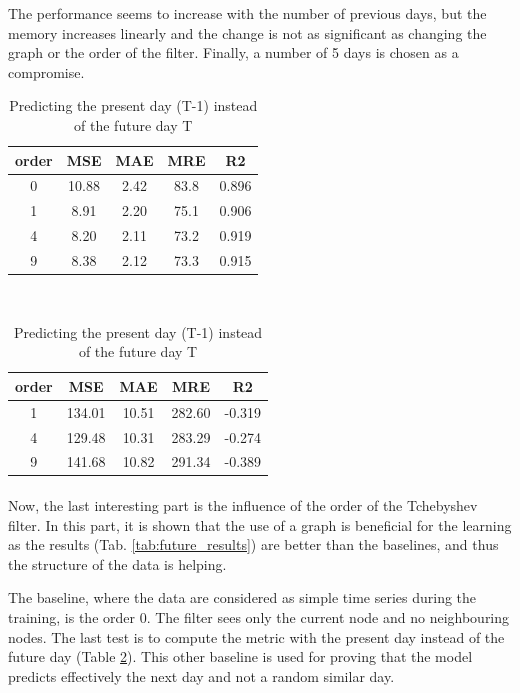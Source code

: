 \documentclass[11pt]{report}
\begin{document}
The performance seems to increase with the number of previous days, but the memory increases linearly and the change is not as significant as changing the graph or the order of the filter. Finally, a number of 5 days is chosen as a compromise.

\begin{table}[!ht]
    \centering
    \begin{tabular}{c|cccc}
        order & MSE & MAE & MRE & R2 \\ \hline 
        0 & 10.88 & 2.42 & 83.8 & 0.896\\
        1 & 8.91 & 2.20 & 75.1 & 0.906\\
        4 & 8.20 & 2.11 & 73.2 & 0.919\\
        9 & 8.38 & 2.12 & 73.3 & 0.915\\
    \end{tabular}
    \caption{Evolution of performance in respect of the order of the filter}
    \label{tab:future_results}
    ~\\[1cm]
    \begin{tabular}{c|cccc}
        order & MSE & MAE & MRE & R2 \\ \hline 
        1 & 134.01 & 10.51 & 282.60 & -0.319\\
        4 & 129.48 & 10.31 & 283.29 & -0.274\\
        9 & 141.68 & 10.82 & 291.34 & -0.389\\
    \end{tabular}
    \caption{Predicting the present day (T-1) instead of the future day T}
    \label{tab:present_results}
\end{table}

\paragraph*{}
Now, the last interesting part is the influence of the order of the Tchebyshev filter. In this part, it is shown that the use of a graph is beneficial for the learning as the results (Tab. \ref{tab:future_results}) are better than the baselines, and thus the structure of the data is helping.

The baseline, where the data are considered as simple time series during the training, is the order 0. The filter sees only the current node and no neighbouring nodes. The last test is to compute the metric with the present day instead of the future day (Table \ref{tab:present_results}). This other baseline is used for proving that the model predicts effectively the next day and not a random similar day.
\end{document}
